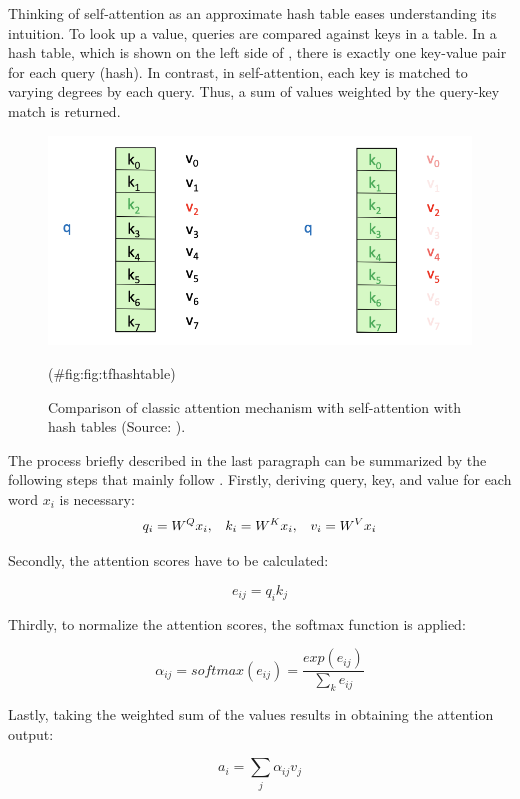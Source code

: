 \documentclass[
]{krantz}
\begin{document}
Thinking of self-attention as an approximate hash table eases
understanding its intuition. To look up a value, queries are compared
against keys in a table. In a hash table, which is shown on the left
side of , there is exactly one key-value pair for each query (hash). In
contrast, in self-attention, each key is matched to varying degrees by
each query. Thus, a sum of values weighted by the query-key match is
returned.

\begin{figure}

{\centering \includegraphics[width=0.7\linewidth]{./figures/01-01-nlp/transformer_hash-table_stanford} 

}

\caption{Comparison of classic attention mechanism with self-attention with
hash tables (Source: \citet{Manning2022}).}(\#fig:fig:tfhashtable)
\end{figure}




The process briefly described in the last paragraph can be summarized by
the following steps that mainly follow \citep{Manning2022}. Firstly, deriving
query, key, and value for each word \(x_i\) is necessary:
\[q_i = W^Q x_i , \hspace{3mm} k_i = W^K x_i, \hspace{3mm} v_i = W^V x_i\]

Secondly, the attention scores have to be calculated:

\[e_{ij} = q_i k_j\]

Thirdly, to normalize the attention scores, the softmax function is
applied:

\[\alpha_{ij} = softmax( e_{ij} ) = \frac{exp(e_{ij})}{\displaystyle \sum_k e_{ij}}\]

Lastly, taking the weighted sum of the values results in obtaining the
attention output:

\[a_{i} = \displaystyle \sum_j \alpha_{ij} v_j\]
\end{document}
